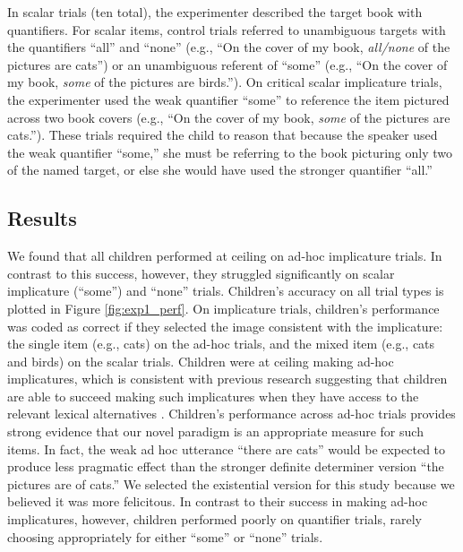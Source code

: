 \documentclass[man]{apa2}
\begin{document}
In scalar trials (ten total), the experimenter described the target book with quantifiers. For scalar items, control trials referred to unambiguous targets with the quantifiers ``all'' and ``none'' (e.g., ``On the cover of my book, \textit{all/none} of the pictures are cats'') or an unambiguous referent of ``some'' (e.g., ``On the cover of my book, \textit{some} of the pictures are birds.''). On critical scalar implicature trials, the experimenter used the weak quantifier ``some'' to reference the item pictured across two book covers (e.g., ``On the cover of my book, \textit{some} of the pictures are cats.''). These trials required the child to reason that because the speaker used the weak quantifier ``some,'' she must be referring to the book picturing only two of the named target, or else she would have used the stronger quantifier ``all.''

\subsection{Results}

We found that all children performed at ceiling on ad-hoc implicature trials. In contrast to this success, however, they struggled significantly on scalar implicature (``some'') and ``none'' trials. Children's accuracy on all trial types is plotted in Figure \ref{fig:exp1_perf}. On implicature trials, children's performance was coded as correct if they selected the image consistent with the implicature: the single item (e.g., cats) on the ad-hoc trials, and the mixed item (e.g., cats and birds) on the scalar trials. Children were at ceiling making ad-hoc implicatures, which is consistent with previous research suggesting that children are able to succeed making such implicatures when they have access to the relevant lexical alternatives \cite{stiller2015}. Children's performance across ad-hoc trials provides strong evidence that our novel paradigm is an appropriate measure for such items. In fact, the weak ad hoc utterance ``there are cats'' would be expected to produce less pragmatic effect than the stronger definite determiner version ``the pictures are of cats.'' We selected the existential version for this study because we believed it was more felicitous. In contrast to their success in making ad-hoc implicatures, however, children performed poorly on quantifier trials, rarely choosing appropriately for either ``some'' or ``none'' trials.

\end{document}

